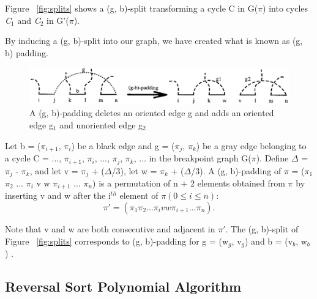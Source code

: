 \documentclass[10pt]{article}
\begin{document}
Figure ~\ref{fig:splits} shows a (g, b)-split transforming a cycle C in
G($\pi$) into cycles \emph{C$_{1}$} and \emph{C$_{2}$} in G'($\pi$).

By inducing a (g, b)-split into our graph, we have created what is known as (g,
b) padding.

\begin{figure}[here]
\includegraphics[scale=0.4]{resources/padding.eps}
\caption{A (g, b)-padding deletes an oriented edge g and adds an oriented edge
g$_{1}$ and unoriented edge g$_{2}$}
\label{fig:padding}
\end{figure}

Let b = ($\pi$$_{i+1}$, $\pi$$_{i}$) be a black edge and g = ($\pi$$_{j}$,
$\pi$$_{k}$) be a gray edge belonging to a cycle C = ..., $\pi$$_{i+1}$,
$\pi$$_{i}$, ..., $\pi$$_{j}$, $\pi$$_{k}$, ... in the breakpoint graph
G($\pi$). Define $\Delta$ = $\pi$$_{j}$ - $\pi$$_{k}$, and let v = $\pi$$_{j}$
+ ($\Delta$/3), let w = $\pi$$_{k}$ + ($\Delta$/3). A (g, b)-padding of $\pi$ =
($\pi$$_{1}$$\pi$$_{2}$  ... $\pi$$_{i}$  v w  $\pi$$_{i+1}$ ... $\pi$$_{n}$)
is a permutation of n + 2 elements obtained from $\pi$ by inserting v and w
after the i$^{th}$ element of $\pi (0 \leq i \leq n)$:
$$\pi' = (\pi_{1}\pi_{2}...\pi_{i}vw\pi_{i+1} ... \pi_{n}). $$

Note that v and w are both consecutive and adjacent in $\pi'$. The (g, b)-split
of Figure ~\ref{fig:splits} corresponds to (g, b)-padding for g = (w$_{g}$,
v$_{g}$) and b = (v$_{b}$, w$_{b}$) \cite{Hannenhalli95transformingcabbage}.

\subsection*{Reversal Sort Polynomial Algorithm}
\end{document}
